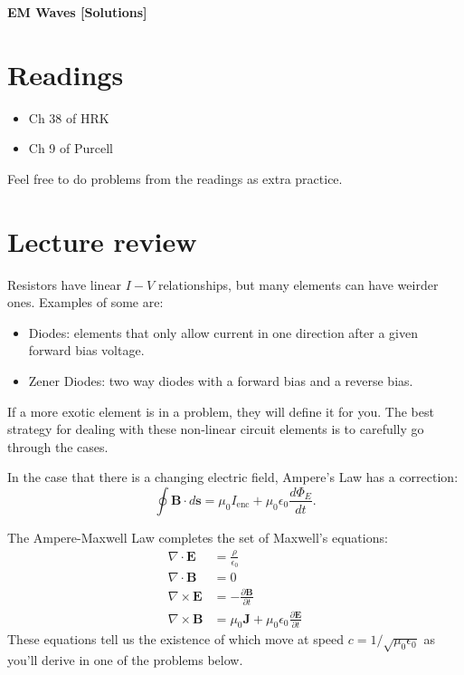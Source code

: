 \documentclass[11pt]{scrartcl}
\title{\titlee}
\author{Cambridge Physics Academy}
\date{2023-2024}
\newcommand{\titlee}{EM Waves [Solutions]}
\begin{document}
\thispagestyle{empty}
\begin{center}
    
    
    \Huge \textbf{\textsf{\titlee}}

    \large \theauthor
\end{center}

\setcounter{section}{-1}
\section{Readings}
\begin{itemize}
    \item Ch 38 of HRK
    \item Ch 9 of Purcell
\end{itemize}
Feel free to do problems from the readings as extra practice.


\section{Lecture review}

\begin{idea}
    Resistors have linear $I-V$ relationships, but many elements can have weirder ones. Examples of some are:
    \begin{itemize}
        \item Diodes: elements that only allow current in one direction after a given forward bias voltage.
        \item Zener Diodes: two way diodes with a forward bias and a reverse bias.
    \end{itemize}
    If a more exotic element is in a problem, they will define it for you. The best strategy for dealing with these non-linear circuit elements is to carefully go through the cases.
\end{idea}

\begin{theorem}
    In the case that there is a changing electric field, Ampere’s Law has a correction:
    $$\oint \mathbf B \cdot d \mathbf s = \mu_0 I_{\text{enc}} + \mu_0\epsilon_0 \frac{d\Phi_E}{dt}.$$
\end{theorem}

\begin{theorem}
    The Ampere-Maxwell Law completes the set of Maxwell's equations:
    \begin{align*}
        \nabla \cdot \mathbf E &= \frac \rho{\epsilon_0}\\
        \nabla \cdot \mathbf B &= 0\\
        \nabla \times \mathbf E &= -\frac{\partial \mathbf B}{\partial t}\\
        \nabla \times \mathbf B &= \mu_0 \mathbf J + \mu_0\epsilon_0 \frac{\partial \mathbf E}{\partial t}
    \end{align*}
    These equations tell us the existence of  which move at speed $c =1/\sqrt{\mu_0\epsilon_0}$ as you'll derive in one of the problems below.
\end{theorem}
\end{document}
